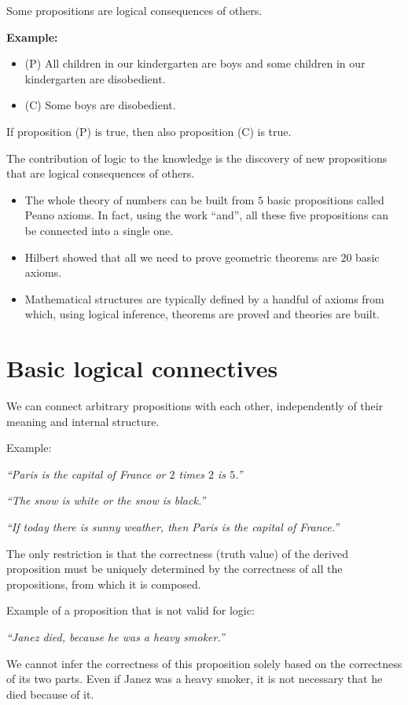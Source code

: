 \documentclass[11pt,paper=b5,footinclude,headinclude]{scrbook} %
\theoremstyle{remark}
\theoremstyle{definition} %
\begin{document}
Some propositions are logical consequences of others.

\textbf{Example:}
\begin{itemize}
  \item (P) All children in our kindergarten are boys and some children in our kindergarten are disobedient.
  \item (C) Some boys are disobedient.
\end{itemize}
If proposition (P) is true, then also proposition (C) is true.


The contribution of logic to the knowledge is the discovery of new propositions that are logical consequences of others.
\begin{itemize}
  \item The whole theory of numbers can be built from $5$ basic propositions called Peano axioms. In fact, using the work ``and'', all these five propositions can be connected into a single one.
  \item Hilbert showed that all we need to prove geometric theorems are $20$ basic axioms.
  \item Mathematical structures are typically defined by a handful of axioms from which, using logical inference, theorems are proved and theories are built.
\end{itemize}

\section*{Basic logical connectives}

We can connect arbitrary propositions with each other, independently of their meaning and internal structure.

Example:

{\em ``Paris is the capital of France or $2$ times $2$ is $5$.''~}

{\em ``The snow is white or the snow is black.''}

{\em ``If today there is sunny weather, then Paris is the capital of France.''}

\medskip
The only restriction is that the correctness (truth value) of the derived proposition must be
uniquely determined by the correctness of all the propositions, from which it is composed.

Example of a proposition that is not valid for logic:

{\em ``Janez died, because he was a heavy smoker.''}

We cannot infer the correctness of this proposition solely based on the correctness
of its two parts. Even if Janez was a heavy smoker, it is not necessary that he died because of it.
\end{document}
